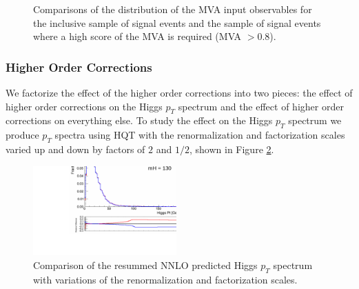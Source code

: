 \begin{figure}[!htbp]
\begin{center}
\caption{Comparisons of the distribution of the MVA input observables for the
inclusive sample of signal events and the sample of signal events where a
high score of the MVA is required (MVA $>0.8$).
}
\label{fig:MVAHighScorePhaseSpaceRegion}
\end{center}
\end{figure}


\subsubsection{Higher Order Corrections}

We factorize the effect of the higher order corrections into two
pieces: the effect of higher order corrections on the Higgs $p_{T}$ spectrum
and the effect of higher order corrections on everything else. To study the
effect on the Higgs $p_{T}$ spectrum we produce $p_{T}$ spectra using HQT
with the renormalization and factorization scales varied up and down by factors 
of $2$ and $1/2$, shown in Figure \ref{fig:signalshape_PtSpectrumScaleVariation_HiggsPt}.

\begin{figure}[!htbp]
\begin{center}
\includegraphics[width=0.49\textwidth]{figures/ShapeSystematics_HWW_HiggsPt_HQTScaleVariation.pdf}
\caption{Comparison of the resummed NNLO predicted Higgs $p_{T}$ spectrum with variations of
the renormalization and factorization scales.
}
\label{fig:signalshape_PtSpectrumScaleVariation_HiggsPt}
\end{center}
\end{figure}


